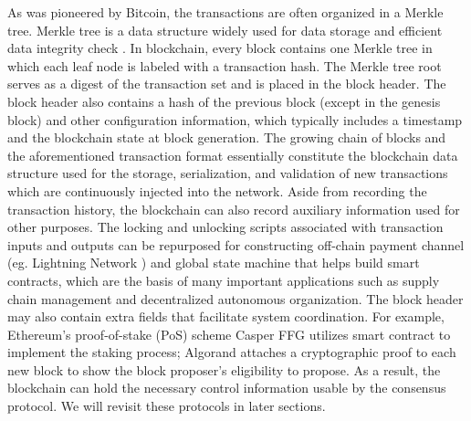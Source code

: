 As was pioneered by Bitcoin, the transactions are often organized in a Merkle tree. Merkle tree is a data structure widely used for data storage and efficient data integrity check . In blockchain, every block contains one Merkle tree in which each leaf node is labeled with a transaction hash. The Merkle tree root serves as a digest of the transaction set and is placed in the block header.
The block header also contains a hash of the previous block (except in the genesis block) and other configuration information, which typically includes a timestamp and the blockchain state at block generation.
{\color{\rcolor}The growing chain of blocks and the aforementioned transaction format essentially constitute the blockchain data structure used for the storage, serialization, and validation of new transactions which are continuously injected into the network.}
Aside from recording the transaction history, the blockchain can also record auxiliary information used for other purposes. 
{\color{\rcolor}
The locking and unlocking scripts associated with transaction inputs and outputs can be repurposed for constructing off-chain payment channel (eg. Lightning Network ) and global state machine that helps build smart contracts, which are the basis of many important applications such as supply chain management and decentralized autonomous organization.
}
The block header may also contain extra fields that facilitate system coordination. For example, Ethereum's proof-of-stake (PoS) scheme Casper FFG  utilizes smart contract to implement the staking process; Algorand  attaches a cryptographic proof to each new block to show the block proposer's eligibility to propose. As a result, the blockchain can hold the necessary control information usable by the consensus protocol. We will revisit these protocols in later sections.

